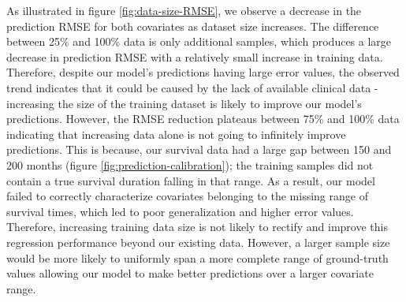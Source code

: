 \documentclass{l4proj}
\begin{document}
As illustrated in figure \ref{fig:data-size-RMSE}, we observe a decrease in the prediction RMSE for both covariates as dataset size increases. The difference between 25\% and 100\% data is only additional samples, which produces a large decrease in prediction RMSE with a relatively small increase in training data. Therefore, despite our model's predictions having large error values, the observed trend indicates that it could be caused by the lack of available clinical data - increasing the size of the training dataset is likely to improve our model's predictions. However, the RMSE reduction plateaus between 75\% and 100\% data indicating that increasing data alone is not going to infinitely improve predictions. This is because, our survival data had a large gap between 150 and 200 months (figure \ref{fig:prediction-calibration}); the training samples did not contain a true survival duration falling in that range. As a result, our model failed to correctly characterize covariates belonging to the missing range of survival times, which led to poor generalization and higher error values. Therefore, increasing  training data size is not likely to rectify and improve this regression performance beyond our existing data. However, a larger sample size would be more likely to uniformly span a more complete range of ground-truth values allowing our model to make better predictions over a larger covariate range. 
\end{document}
